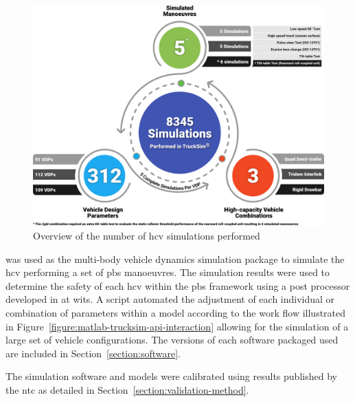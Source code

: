 \begin{figure}[H]
	\centering
	\includegraphics[width=1\textwidth]{fig/Number-of-simulations-Infographic}
	\caption{Overview of the number of \gls{hcv} simulations performed}
	\label{figure:number-of-simulations-overview}
\end{figure}

\trucksim{} was used as the multi-body vehicle dynamics simulation package to simulate the \gls{hcv} performing a set of \gls{pbs} manoeuvres. The simulation results were used to determine the safety of each \gls{hcv} within the \gls{pbs} framework using a post processor developed in \matlab{} at \gls{wits}. A \matlab{} script automated the adjustment of each individual or combination of parameters within a \trucksim{} model according to the work flow illustrated in Figure~\ref{figure:matlab-trucksim-api-interaction} allowing for the simulation of a large set of vehicle configurations. The versions of each software packaged used are included in Section~\ref{section:software}.

The simulation software and models were calibrated using results published by the \gls{ntc} as detailed in Section~\ref{section:validation-method}.

